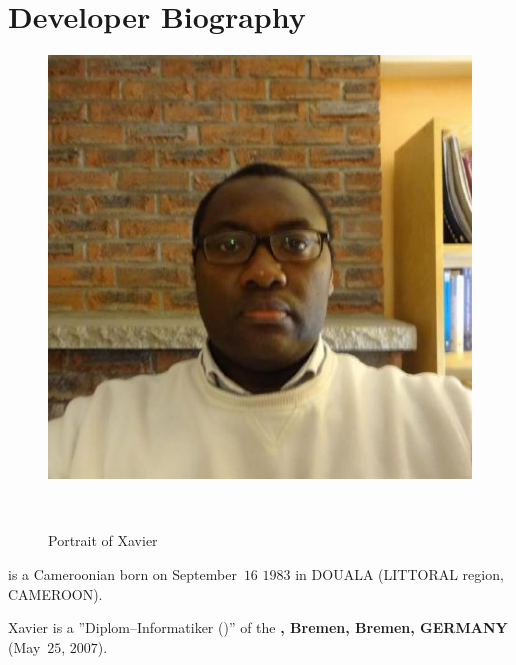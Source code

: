 \section{Developer Biography}\label{chap:biography}
\vspace{-0.6em}
\begin{figure}[!htpb]
\centering
\includegraphics[scale=0.35]{../../francais/images/XavierNOUNDOU-2}
\caption{Portrait of Xavier}~\label{fig:xaviernoumbis}
\end{figure}

\textbf{\myfullacademicname} is a Cameroonian
born on September~$16$ $1983$ in DOUALA (LITTORAL region, CAMEROON).

Xavier is a ''Diplom--Informatiker (\diplinf)'' of
the \textbf{\unibremen, Bremen, Bremen, GERMANY} (May~$25$, $2007$).